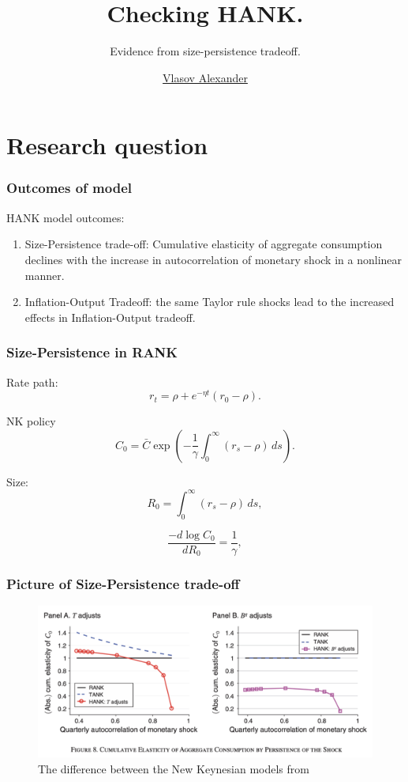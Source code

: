 \documentclass[11pt,pdf,aspectratio=129]{beamer}
\title{Checking HANK.}
\subtitle{Evidence from size-persistence tradeoff.}
\author{\href{mailto://avlasov@nes.ru}{Vlasov Alexander}}
\institute{NES}
\begin{document}
\begin{frame}[fragile]
    \titlepage
\end{frame}


\section{Research question}



\begin{frame}\frametitle{Outcomes of \citet{KMV2018} model}
    \citet{KMV2018} HANK model outcomes:
    \begin{enumerate}
        \item Size-Persistence trade-off: Cumulative elasticity of aggregate consumption declines with the increase in autocorrelation of monetary shock in a nonlinear manner.
        \item Inflation-Output Tradeoff: the same Taylor rule shocks lead to the increased effects in Inflation-Output tradeoff.
    \end{enumerate}


  
\end{frame}


\begin{frame}\frametitle{Size-Persistence in RANK}
Rate path:
    \begin{equation*}
        r_t=\rho+e^{-\eta t}(r_0-\rho).\label{eq:InterestRatePath}
    \end{equation*}

NK policy    
\[C_0=\bar C\exp\left(-\frac{1}{\gamma}\int_0^\infty \left(r_s-\rho\right)\,ds\right).\]

Size:
\begin{equation*}
    R_0=\int_0^\infty \left(r_s-\rho\right)\,ds,\label{eq:KMVsize}
\end{equation*}


\[\frac{-d \log C_0}{dR_0}=\frac{1}{\gamma},\]


\end{frame}

\begin{frame}\frametitle{Picture of Size-Persistence trade-off}
    \begin{figure}\centering
        \includegraphics[scale=0.47]{Size_Persistence_KMV.png}
        \caption{The difference between the New Keynesian models from \citet{KMV2018}}
    \end{figure}
\end{frame}
\end{document}
